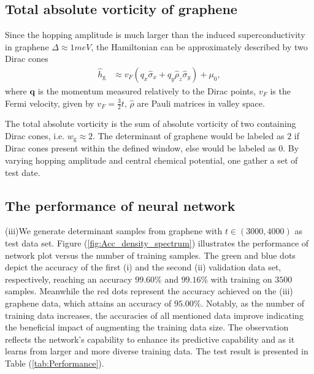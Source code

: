 \documentclass{article}
\begin{document}
\subsection{Total absolute vorticity of graphene}
Since the hopping amplitude is much larger than the induced superconductivity in graphene $ \Delta \approx 1meV $, the Hamiltonian can be approximately described by two Dirac cones 
\begin{align}
    \hat{h}_{\textrm{g}} &\approx   v_{F} \left( q_x \hat{\sigma}_x + q_y \hat{\rho}_z \hat{\sigma}_y \right) + \mu_0,
\end{align}
where $ \mathbf{q} $ is the momentum measured relatively to the Dirac points, $ v_F $ is the Fermi velocity, given by $ v_F = \frac{3}{2} t $, $ \hat{\rho} $ are Pauli matrices in valley space. 

The total absolute vorticity is the sum of absolute vorticity of two containing Dirac cones, i.e. $ w_{\textrm{g}} \approx 2  $. The determinant of graphene would be labeled as $ 2 $ if Dirac cones present within the defined window, else would be labeled as $ 0 $. By varying hopping amplitude and central chemical potential, one gather a set of test date.



\subsection{The performance of neural network}
(iii)We generate determinant samples from graphene with $ t \in \left(3000,4000\right) $ as test data set. Figure (\ref{fig:Acc_density_spectrum}) illustrates the performance of network plot versus the number of training samples. The green and blue dots depict the accuracy of the first (i) and the second (ii) validation data set, respectively, reaching an accuracy $ 99.60 \% $ and $ 99.16 \% $ with training on $ 3500 $ samples. Meanwhile the red dots represent the accuracy achieved on the (iii) graphene data, which attains an accuracy of $ 95.00 \% $. Notably, as the number of training data increases, the accuracies of all mentioned data improve indicating the beneficial impact of augmenting the training data size. The observation reflects the network's capability to enhance its predictive capability and as it learns from larger and more diverse training data. The test result is presented in Table (\ref{tab:Performance}). 
\end{document}
